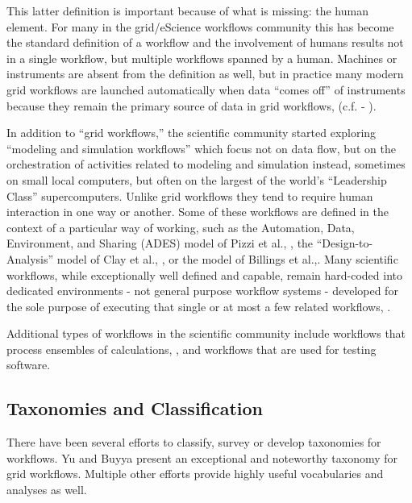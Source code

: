 This latter definition is important because of what is missing: the human
element. For many in the grid/eScience workflows community this has become
the standard definition of a workflow and the involvement of humans
results not in a single workflow, but multiple workflows spanned by a human.
Machines or instruments are absent from the definition as well, but in
practice many modern grid workflows are launched automatically
when data ``comes off'' of instruments because they remain the primary
source of data in grid workflows, (c.f. - \cite{megino_panda:_2015}).

In addition to ``grid workflows,'' the scientific community started
exploring ``modeling and simulation workflows'' which focus not on data
flow, but on the orchestration of activities related to modeling and
simulation instead, sometimes on small local computers, but often on the
largest of the world's ``Leadership Class'' supercomputers. Unlike grid
workflows they tend to require human interaction in one way or another.
Some of these workflows are defined in the context of a particular way
of working, such as the Automation, Data, Environment, and Sharing
(ADES) model of Pizzi et al., \cite{pizzi_aiida:_2016}, the
``Design-to-Analysis'' model of Clay et al., \cite{clay_incorporating_2015}, or
the model of Billings et al.,\cite{billings_eclipse_2017}. Many scientific workflows, while exceptionally well defined and capable, remain hard-coded into dedicated environments - 
not general purpose workflow systems - developed for the sole purpose of
executing that single or at most a few related workflows, \cite{lingerfelt_beam:_2016}.

Additional types of workflows in the scientific community include
workflows that process ensembles of calculations, \cite{montoya_apex_2016},
and workflows that are used for testing software. 

\subsection{Taxonomies and
Classification}\label{taxonomies-and-classification}
There have been several efforts to classify, survey or develop taxonomies
for workflows. Yu and Buyya present an exceptional and noteworthy taxonomy for grid
workflows. Multiple other efforts provide highly useful vocabularies and analyses as
well.

